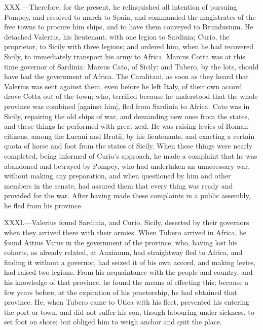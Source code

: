 XXX.—Therefore, for the present, he relinquished all intention of
pursuing Pompey, and resolved to march to Spain, and commanded the
magistrates of the free towns to procure him ships, and to have them
conveyed to Brundusium. He detached Valerius, his lieutenant, with one
legion to Sardinia; Curio, the proprietor, to Sicily with three legions;
and ordered him, when he had recovered Sicily, to immediately transport
his army to Africa. Marcus Cotta was at this time governor of Sardinia:
Marcus Cato, of Sicily: and Tubero, by the lots, should have had the
government of Africa. The Caralitani, as soon as they heard that
Valerius was sent against them, even before he left Italy, of their own
accord drove Cotta out of the town; who, terrified because he understood
that the whole province was combined [against him], fled from Sardinia
to Africa. Cato was in Sicily, repairing the old ships of war, and
demanding new ones from the states, and these things he performed with
great zeal. He was raising levies of Roman citizens, among the Lucani
and Brutii, by his lieutenants, and exacting a certain quota of horse
and foot from the states of Sicily. When these things were nearly
completed, being informed of Curio's approach, he made a complaint that
he was abandoned and betrayed by Pompey, who had undertaken an
unnecessary war, without making any preparation, and when questioned by
him and other members in the senate, had assured them that every thing
was ready and provided for the war. After having made these complaints
in a public assembly, he fled from his province.

XXXI.—Valerius found Sardinia, and Curio, Sicily, deserted by their
governors when they arrived there with their armies. When Tubero arrived
in Africa, he found Attius Varus in the government of the province, who,
having lost his cohorts, as already related, at Auximum, had straightway
fled to Africa, and finding it without a governor, had seized it of his
own accord, and making levies, had raised two legions. From his
acquaintance with the people and country, and his knowledge of that
province, he found the means of effecting this; because a few years
before, at the expiration of his praetorship, he had obtained that
province. He, when Tubero came to Utica with his fleet, prevented his
entering the port or town, and did not suffer his son, though labouring
under sickness, to set foot on shore; but obliged him to weigh anchor
and quit the place.

